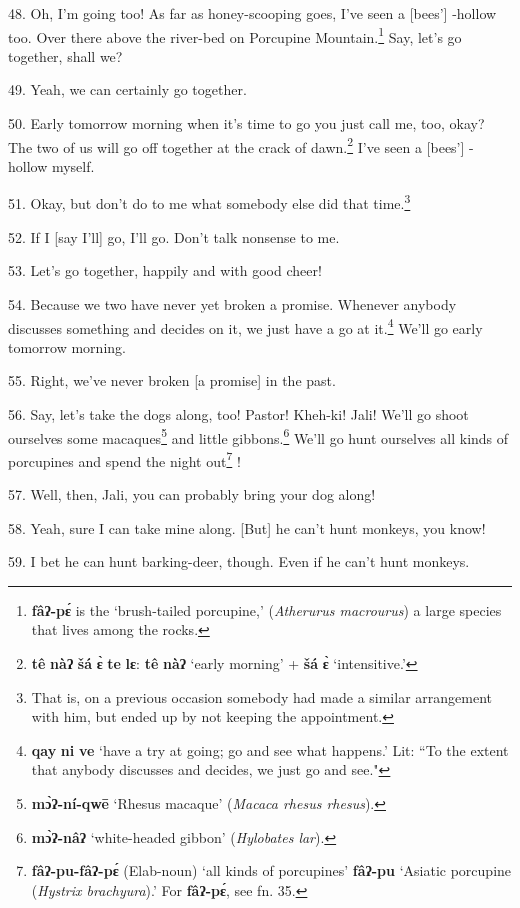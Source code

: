 48. Oh, I'm going too! As far as honey-scooping goes, I've seen a [bees'] -hollow
too. Over there above the river-bed on Porcupine Mountain.\footnote{\textbf{fâʔ-pɛ́} is the `brush-tailed porcupine,' (\textit{Atherurus macrourus}) a large species that lives among the rocks.} Say, let's go together,
shall we?

49. Yeah, we can certainly go together.

50. Early tomorrow morning when it's time to go you just call me, too, okay? The
two of us will go off together at the crack of dawn.\footnote{\textbf{tê} \textbf{nàʔ} \textbf{šá} \textbf{ɛ̀} \textbf{te} \textbf{lɛ}: \textbf{tê} \textbf{nàʔ} `early morning' + \textbf{šá} \textbf{ɛ̀} `intensitive.'} I've seen a [bees'] -hollow
myself.

51. Okay, but don't do to me what somebody else did that time.\footnote{That is, on a previous occasion somebody had made a similar arrangement with him, but ended up by not keeping the appointment.}

52. If I [say I'll] go, I'll go. Don't talk nonsense to me.

53. Let's go together, happily and with good cheer!

54. Because we two have never yet broken a promise. Whenever anybody discusses
something and decides on it, we just have a go at it.\footnote{\textbf{qay} \textbf{ni} \textbf{ve} `have a try at going; go and see what happens.' Lit: ``To the extent that anybody discusses and decides, we just go and see."} We'll go early tomorrow
morning.

55. Right, we've never broken [a promise] in the past.

56. Say, let's take the dogs along, too! Pastor! Kheh-ki! Jali! We'll go shoot
ourselves some macaques\footnote{\textbf{mɔ̀ʔ-ní-qwē} `Rhesus macaque' (\textit{Macaca rhesus rhesus}).} and little gibbons.\footnote{\textbf{mɔ̀ʔ-nâʔ} `white-headed gibbon' (\textit{Hylobates lar}).} We'll go hunt ourselves all
kinds of porcupines and spend the night out\footnote{\textbf{fâʔ-pu-fâʔ-pɛ́} (Elab-noun) `all kinds of porcupines' \textbf{fâʔ-pu} `Asiatic porcupine (\textit{Hystrix brachyura}).' For \textbf{fâʔ-pɛ́}, see fn. 35.} !

57. Well, then, Jali, you can probably bring your dog along!

58. Yeah, sure I can take mine along. [But] he can't hunt monkeys, you know!

59. I bet he can hunt barking-deer, though. Even if he can't hunt monkeys.

